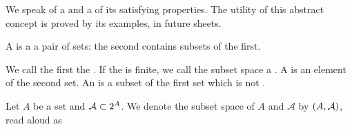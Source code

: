 
\sbasic



\sstart



We speak of a
and a
of its
satisfying properties.
The utility of this
abstract concept
is proved by its examples,
in future sheets.


A
is a a pair of sets:
the second contains subsets of
the first.

We call the first
the
.
If the
is finite,
we call the subset space a
.
A
is an element of the second set.
An
is a subset of the first set which is not
.



Let $A$ be a set and $\mathcal{A} \subset 2^{A}$.
We denote the subset space of $A$ and $\mathcal{A}$
by $\left(A, \mathcal{A}\right)$, read aloud as 

\strats
